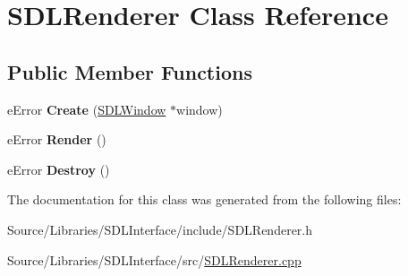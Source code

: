 \hypertarget{class_s_d_l_renderer}{\section{S\-D\-L\-Renderer Class Reference}
\label{class_s_d_l_renderer}
}
\subsection*{Public Member Functions}
\begin{DoxyCompactItemize}
\item 
\hypertarget{class_s_d_l_renderer_a4e285fad6b9bf9d6d146950cf7f134ce}{e\-Error {\bfseries Create} (\hyperlink{class_s_d_l_window}{S\-D\-L\-Window} $\ast$window)}\label{class_s_d_l_renderer_a4e285fad6b9bf9d6d146950cf7f134ce}

\item 
\hypertarget{class_s_d_l_renderer_af04b495115d2d82e261978b790cbde6e}{e\-Error {\bfseries Render} ()}\label{class_s_d_l_renderer_af04b495115d2d82e261978b790cbde6e}

\item 
\hypertarget{class_s_d_l_renderer_a6555de3413ba1f4ea19a86df9f9b63b4}{e\-Error {\bfseries Destroy} ()}\label{class_s_d_l_renderer_a6555de3413ba1f4ea19a86df9f9b63b4}

\end{DoxyCompactItemize}


The documentation for this class was generated from the following files\-:\begin{DoxyCompactItemize}
\item 
Source/\-Libraries/\-S\-D\-L\-Interface/include/S\-D\-L\-Renderer.\-h\item 
Source/\-Libraries/\-S\-D\-L\-Interface/src/\hyperlink{_s_d_l_renderer_8cpp}{S\-D\-L\-Renderer.\-cpp}\end{DoxyCompactItemize}
